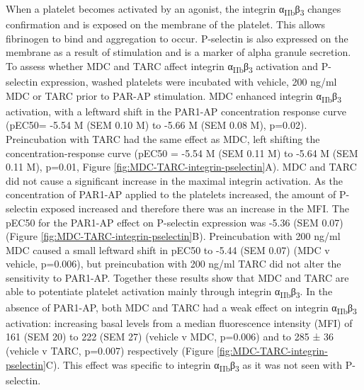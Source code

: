 \documentclass[11pt,twoside]{bristolthesis}
\begin{document}
When a platelet becomes activated by an agonist, the integrin α\textsubscript{IIb}β\textsubscript{3} changes confirmation and is exposed on the membrane of the platelet. This allows fibrinogen to bind and aggregation to occur. P-selectin is also expressed on the membrane as a result of stimulation and is a marker of alpha granule secretion. To assess whether MDC and TARC affect integrin α\textsubscript{IIb}β\textsubscript{3} activation and P-selectin expression, washed platelets were incubated with vehicle, 200 ng/ml MDC or TARC prior to PAR-AP stimulation. MDC enhanced integrin α\textsubscript{IIb}β\textsubscript{3} activation, with a leftward shift in the PAR1-AP concentration response curve (pEC50= -5.54 M (SEM 0.10 M) to -5.66 M (SEM 0.08 M), p=0.02). Preincubation with TARC had the same effect as MDC, left shifting the concentration-response curve (pEC50 = -5.54 M (SEM 0.11 M) to -5.64 M (SEM 0.11 M), p=0.01, Figure \ref{fig:MDC-TARC-integrin-pselectin}A). MDC and TARC did not cause a significant increase in the maximal integrin activation. As the concentration of PAR1-AP applied to the platelets increased, the amount of P-selectin exposed increased and therefore there was an increase in the MFI. The pEC50 for the PAR1-AP effect on P-selectin expression was -5.36 (SEM 0.07) (Figure \ref{fig:MDC-TARC-integrin-pselectin}B). Preincubation with 200 ng/ml MDC caused a small leftward shift in pEC50 to -5.44 (SEM 0.07) (MDC v vehicle, p=0.006), but preincubation with 200 ng/ml TARC did not alter the sensitivity to PAR1-AP. Together these results show that MDC and TARC are able to potentiate platelet activation mainly through integrin α\textsubscript{IIb}β\textsubscript{3}. In the absence of PAR1-AP, both MDC and TARC had a weak effect on integrin α\textsubscript{IIb}β\textsubscript{3} activation: increasing basal levels from a median fluorescence intensity (MFI) of 161 (SEM 20) to 222 (SEM 27) (vehicle v MDC, p=0.006) and to 285 ± 36 (vehicle v TARC, p=0.007) respectively (Figure \ref{fig:MDC-TARC-integrin-pselectin}C). This effect was specific to integrin α\textsubscript{IIb}β\textsubscript{3} as it was not seen with P-selectin.
\end{document}
